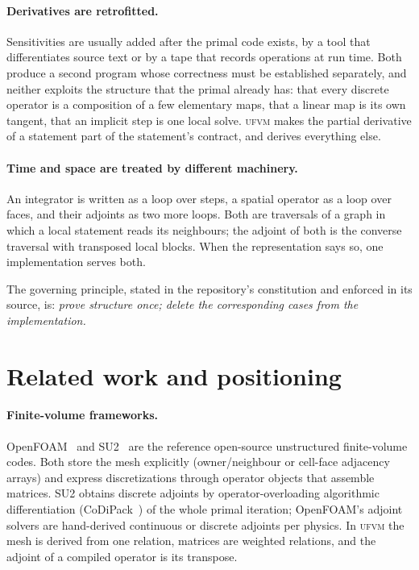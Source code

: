 \documentclass[11pt,a4paper]{article}
\newcommand{\ufvm}{\textsc{ufvm}}
\begin{document}
\paragraph{Derivatives are retrofitted.} Sensitivities are usually added after the primal code exists, by a tool that differentiates source text or by a tape that records operations at run time. Both produce a second program whose correctness must be established separately, and neither exploits the structure that the primal already has: that every discrete operator is a composition of a few elementary maps, that a linear map is its own tangent, that an implicit step is one local solve. \ufvm{} makes the partial derivative of a statement part of the statement's contract, and derives everything else.

\paragraph{Time and space are treated by different machinery.} An integrator is written as a loop over steps, a spatial operator as a loop over faces, and their adjoints as two more loops. Both are traversals of a graph in which a local statement reads its neighbours; the adjoint of both is the converse traversal with transposed local blocks. When the representation says so, one implementation serves both.

The governing principle, stated in the repository's constitution and enforced in its source, is: \emph{prove structure once; delete the corresponding cases from the implementation.}

\section{Related work and positioning}\label{sec:related}

\paragraph{Finite-volume frameworks.} OpenFOAM~\cite{weller1998} and SU2~\cite{economon2016} are the reference open-source unstructured finite-volume codes. Both store the mesh explicitly (owner/neighbour or cell-face adjacency arrays) and express discretizations through operator objects that assemble matrices. SU2 obtains discrete adjoints by operator-overloading algorithmic differentiation (CoDiPack~\cite{sagebaum2019}) of the whole primal iteration; OpenFOAM's adjoint solvers are hand-derived continuous or discrete adjoints per physics. In \ufvm{} the mesh is derived from one relation, matrices are weighted relations, and the adjoint of a compiled operator is its transpose.
\end{document}
